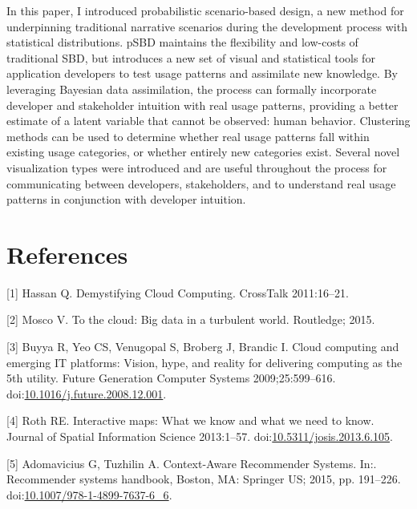 \documentclass[]{article}
\begin{document}
In this paper, I introduced probabilistic scenario-based design, a new
method for underpinning traditional narrative scenarios during the
development process with statistical distributions. pSBD maintains the
flexibility and low-costs of traditional SBD, but introduces a new set
of visual and statistical tools for application developers to test usage
patterns and assimilate new knowledge. By leveraging Bayesian data
assimilation, the process can formally incorporate developer and
stakeholder intuition with real usage patterns, providing a better
estimate of a latent variable that cannot be observed: human behavior.
Clustering methods can be used to determine whether real usage patterns
fall within existing usage categories, or whether entirely new
categories exist. Several novel visualization types were introduced and
are useful throughout the process for communicating between developers,
stakeholders, and to understand real usage patterns in conjunction with
developer intuition.

\section*{References}\label{references}

\hypertarget{refs}{}
\hypertarget{ref-Hassan:2011uh}{}
{[}1{]} Hassan Q. Demystifying Cloud Computing. CrossTalk 2011:16--21.

\hypertarget{ref-Mosco:2014cu}{}
{[}2{]} Mosco V. To the cloud: Big data in a turbulent world. Routledge;
2015.

\hypertarget{ref-Buyya:2009ix}{}
{[}3{]} Buyya R, Yeo CS, Venugopal S, Broberg J, Brandic I. Cloud
computing and emerging IT platforms: Vision, hype, and reality for
delivering computing as the 5th utility. Future Generation Computer
Systems 2009;25:599--616.
doi:\href{https://doi.org/10.1016/j.future.2008.12.001}{10.1016/j.future.2008.12.001}.

\hypertarget{ref-Roth:2013fv}{}
{[}4{]} Roth RE. Interactive maps: What we know and what we need to
know. Journal of Spatial Information Science 2013:1--57.
doi:\href{https://doi.org/10.5311/josis.2013.6.105}{10.5311/josis.2013.6.105}.

\hypertarget{ref-Adomavicius:2015fx}{}
{[}5{]} Adomavicius G, Tuzhilin A. Context-Aware Recommender Systems.
In:. Recommender systems handbook, Boston, MA: Springer US; 2015, pp.
191--226.
doi:\href{https://doi.org/10.1007/978-1-4899-7637-6_6}{10.1007/978-1-4899-7637-6\_6}.
\end{document}
